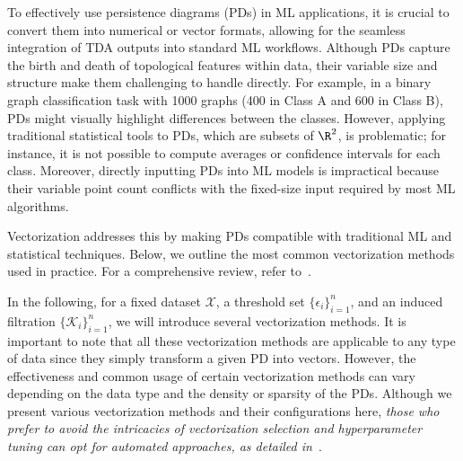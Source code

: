 To effectively use persistence diagrams (PDs) in ML applications, it is crucial to convert them into numerical or vector formats, allowing for the seamless integration of TDA outputs into standard ML workflows. Although PDs capture the birth and death of topological features within data, their variable size and structure make them challenging to handle directly. For example, in a binary graph classification task with 1000 graphs (400 in Class A and 600 in Class B), PDs might visually highlight differences between the classes. However, applying traditional statistical tools to PDs, which are subsets of $\R^2$, is problematic; for instance, it is not possible to compute averages or confidence intervals for each class. Moreover, directly inputting PDs into ML models is impractical because their variable point count conflicts with the fixed-size input required by most ML algorithms.

Vectorization addresses this by making PDs compatible with traditional ML and statistical techniques. Below, we outline the most common vectorization methods used in practice. For a comprehensive review, refer to~\cite{ali2023survey}.


 

In the following, for a fixed dataset $\mathcal{X}$, a threshold set $\{\epsilon_i\}_{i=1}^n$, and an induced filtration $\{\mathcal{K}_i\}_{i=1}^n$, we will introduce several vectorization methods. It is important to note that all these vectorization methods are applicable to any type of data since they simply transform a given PD into vectors. However, the effectiveness and common usage of certain vectorization methods can vary depending on the data type and the density or sparsity of the PDs. Although we present various vectorization methods and their configurations here, \textit{those who prefer to avoid the intricacies of vectorization selection and hyperparameter tuning can opt for automated approaches, as detailed in~}.
 

